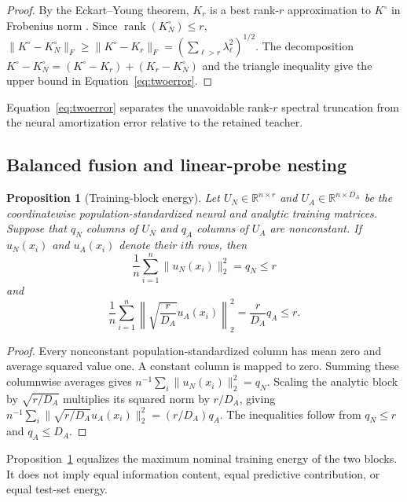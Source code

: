 \documentclass[pdflatex,sn-mathphys-num]{sn-jnl}
\newcommand{\1}{\mathbf{1}}
\theoremstyle{plain}
\newtheorem{proposition}{Proposition}
\begin{document}
	\begin{proof}
		By the Eckart--Young theorem, $K_r$ is a best rank-$r$ approximation to $K^\circ$ in Frobenius norm \cite{eckart1936rank}. Since $\operatorname{rank}(K_N^\circ)\leq r$, $\|K^\circ-K_N^\circ\|_F\geq\|K^\circ-K_r\|_F=(\sum_{\ell>r}\lambda_\ell^2)^{1/2}$. The decomposition $K^\circ-K_N^\circ=(K^\circ-K_r)+(K_r-K_N^\circ)$ and the triangle inequality give the upper bound in Equation~\eqref{eq:twoerror}.
	\end{proof}
	
	Equation~\eqref{eq:twoerror} separates the unavoidable rank-$r$ spectral truncation from the neural amortization error relative to the retained teacher.
	
	\subsection{Balanced fusion and linear-probe nesting}
	
	\begin{proposition}[Training-block energy]
		\label{prop:energy}
		Let $U_N\in\mathbb{R}^{n\times r}$ and $U_A\in\mathbb{R}^{n\times D_A}$ be the coordinatewise population-standardized neural and analytic
		training matrices. Suppose that $q_N$ columns of $U_N$ and $q_A$
		columns of $U_A$ are nonconstant. If $u_N(x_i)$ and $u_A(x_i)$ denote
		their $i$th rows, then
		\begin{equation}
			\frac{1}{n}
			\sum_{i=1}^n
			\|u_N(x_i)\|_2^2
			=
			q_N
			\leq r
			\label{eq:neural_energy}
		\end{equation}
		and
		\begin{equation}
			\frac{1}{n}
			\sum_{i=1}^n
			\left\|
			\sqrt{\frac{r}{D_A}}u_A(x_i)
			\right\|_2^2
			=
			\frac{r}{D_A}q_A
			\leq r.
			\label{eq:analytic_energy}
		\end{equation}
	\end{proposition}
	
	\begin{proof}
		Every nonconstant population-standardized column has mean zero and
		average squared value one. A constant column is mapped to zero.
		Summing these columnwise averages gives $n^{-1}\sum_i\|u_N(x_i)\|_2^2=q_N$. Scaling the analytic block by $\sqrt{r/D_A}$ multiplies its squared norm by $r/D_A$, giving $n^{-1}\sum_i\|\sqrt{r/D_A}u_A(x_i)\|_2^2=(r/D_A)q_A$. The inequalities follow from $q_N\leq r$ and $q_A\leq D_A$.
	\end{proof}
	
	Proposition~\ref{prop:energy} equalizes the maximum nominal training
	energy of the two blocks. It does not imply equal information content,
	equal predictive contribution, or equal test-set energy.
	
\end{document}
